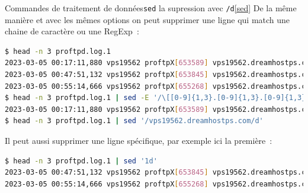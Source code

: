 \documentclass{beamer}
\begin{document}
    \begin{frame}[fragile]{Commandes de traitement de données}{\lstinline{sed} la supression avec \lstinline{/d}\cref{sed}}
        De la même manière et avec les mêmes options on peut supprimer une ligne qui match une chaine de caractère ou une RegExp~:
        \begin{lstlisting}[language=bash,basicstyle=\tiny\ttfamily]
$ head -n 3 proftpd.log.1
2023-03-05 00:17:11,880 vps19562 proftpX[653589] vps19562.dreamhostps.com: ProFTPD 1.3.6c (maint) (built Thu Feb 27 2020 19:34:56 UTC) standalone mode STARTUP
2023-03-05 00:47:51,132 vps19562 proftpX[653845] vps19562.dreamhostps.com (aurora.probe.onyphe.net[142.4.218.114]): USER anonymous: no such user found from aurora.probe.onyphe.net [142.4.218.114] to~::ffff:66.33.201.239:21
2023-03-05 00:55:14,666 vps19562 proftpX[655268] vps19562.dreamhostps.com (hodson.probe.onyphe.net[178.32.197.87]): USER anonymous: no such user found from hodson.probe.onyphe.net [178.32.197.87] to~::ffff:66.33.201.239:21
$ head -n 3 proftpd.log.1 | sed -E '/\[[0-9]{1,3}.[0-9]{1,3}.[0-9]{1,3}.[0-9]{1,3}\]/d'
2023-03-05 00:17:11,880 vps19562 proftpX[653589] vps19562.dreamhostps.com: ProFTPD 1.3.6c (maint) (built Thu Feb 27 2020 19:34:56 UTC) standalone mode STARTUP
$ head -n 3 proftpd.log.1 | sed '/vps19562.dreamhostps.com/d'
        \end{lstlisting}
        Il peut aussi supprimer une ligne spécifique, par exemple ici la première~:
        \begin{lstlisting}[language=bash,basicstyle=\tiny\ttfamily]
$ head -n 3 proftpd.log.1 | sed '1d'
2023-03-05 00:47:51,132 vps19562 proftpX[653845] vps19562.dreamhostps.com (aurora.probe.onyphe.net[142.4.218.114]): USER anonymous: no such user found from aurora.probe.onyphe.net [142.4.218.114] to~::ffff:66.33.201.239:21
2023-03-05 00:55:14,666 vps19562 proftpX[655268] vps19562.dreamhostps.com (hodson.probe.onyphe.net[178.32.197.87]): USER anonymous: no such user found from hodson.probe.onyphe.net [178.32.197.87] to~::ffff:66.33.201.239:21
        \end{lstlisting}
    \end{frame}
\end{document}
